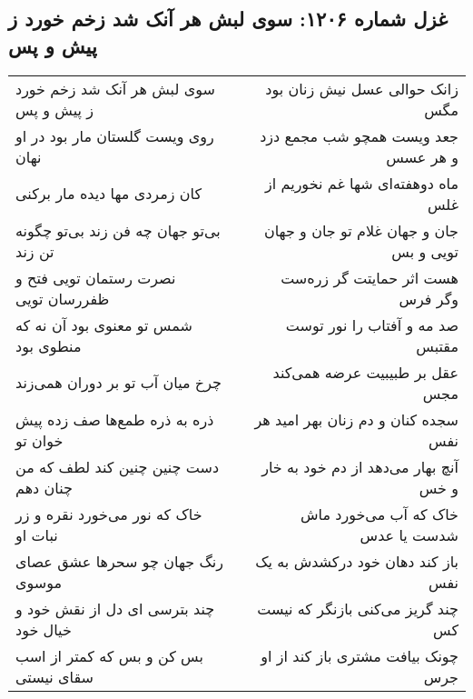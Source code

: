 \begin{center}
\section*{غزل شماره ۱۲۰۶: سوی لبش هر آنک شد زخم خورد ز پیش و پس}
\label{sec:1206}
\begin{longtable}{l p{0.5cm} r}
سوی لبش هر آنک شد زخم خورد ز پیش و پس
&&
زانک حوالی عسل نیش زنان بود مگس
\\
روی ویست گلستان مار بود در او نهان
&&
جعد ویست همچو شب مجمع دزد و هر عسس
\\
کان زمردی مها دیده مار برکنی
&&
ماه دوهفته‌ای شها غم نخوریم از غلس
\\
بی‌تو جهان چه فن زند بی‌تو چگونه تن زند
&&
جان و جهان غلام تو جان و جهان تویی و بس
\\
نصرت رستمان تویی فتح و ظفررسان تویی
&&
هست اثر حمایتت گر زره‌ست وگر فرس
\\
شمس تو معنوی بود آن نه که منطوی بود
&&
صد مه و آفتاب را نور توست مقتبس
\\
چرخ میان آب تو بر دوران همی‌زند
&&
عقل بر طبیبیت عرضه همی‌کند مجس
\\
ذره به ذره طمع‌ها صف زده پیش خوان تو
&&
سجده کنان و دم زنان بهر امید هر نفس
\\
دست چنین چنین کند لطف که من چنان دهم
&&
آنچ بهار می‌دهد از دم خود به خار و خس
\\
خاک که نور می‌خورد نقره و زر نبات او
&&
خاک که آب می‌خورد ماش شدست یا عدس
\\
رنگ جهان چو سحرها عشق عصای موسوی
&&
باز کند دهان خود درکشدش به یک نفس
\\
چند بترسی ای دل از نقش خود و خیال خود
&&
چند گریز می‌کنی بازنگر که نیست کس
\\
بس کن و بس که کمتر از اسب سقای نیستی
&&
چونک بیافت مشتری باز کند از او جرس
\\
\end{longtable}
\end{center}
